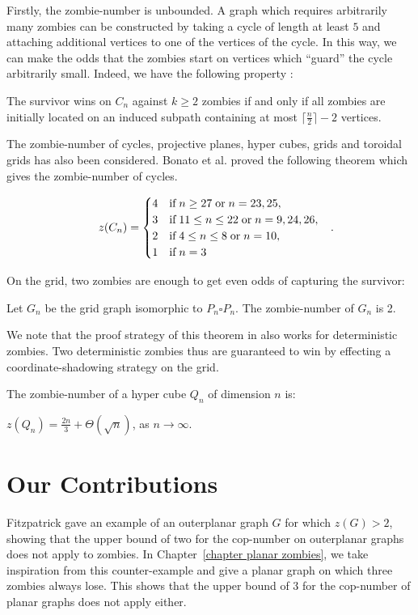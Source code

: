 Firstly, the zombie-number is unbounded. A graph which requires arbitrarily many zombies can be constructed by taking a cycle of length at least $5$ and attaching additional vertices to one of the vertices of the cycle. In this way, we can make the odds that the zombies start on vertices which ``guard'' the cycle arbitrarily small. Indeed, we have the following property \cite{bonato2016probabilistic}:
\begin{lemma}
The survivor wins on $C_n$ against $k \geq 2$ zombies if and only if all zombies are initially located on an induced subpath containing at most $\lceil\frac{n}{2}\rceil-2$ vertices. \label{lemma subpath}
\end{lemma}

The zombie-number of cycles, projective planes, hyper cubes, grids and toroidal grids has also been considered. Bonato et al. proved the following theorem \cite{bonato2016probabilistic} which gives the zombie-number of cycles.

\begin{theorem}
  \[z(C_n) =
  \begin{cases}
    4 & \text{if} \; n \geq 27 \; \text{or} \; n=23,25, \\
    3 & \text{if} \; 11 \leq n \leq 22 \; \text{or} \; n=9,24,26, \\
    2 & \text{if} \; 4 \leq n \leq 8 \; \text{or} \; n=10, \\
    1 & \text{if} \; n =3
\end{cases} \mperiod \]
\end{theorem}

On the grid, two zombies are enough to get even odds \cite{bonato2016probabilistic} of capturing the survivor:
\begin{theorem}
  Let $G_n$ be the grid graph isomorphic to $P_n \square P_n$. The zombie-number of $G_n$ is 2.
\end{theorem}
We note that the proof strategy of this theorem in \cite{bonato2016probabilistic} also works for deterministic zombies. Two deterministic zombies thus are guaranteed to win by effecting a coordinate-shadowing strategy on the grid.

The zombie-number of a hyper cube $Q_n$ of dimension $n$ is:
\begin{theorem}
$z(Q_n) = \frac{2n}{3} + \Theta(\sqrt{n})$, as $n \rightarrow \infty$.
\end{theorem}

\section{Our Contributions}
Fitzpatrick \cite{fitzpatrick2016deterministic} gave an example of an outerplanar graph $G$ for which $z(G) >2$, showing that the upper bound of two for the cop-number on outerplanar graphs does not apply to zombies. In Chapter~\ref{chapter planar zombies}, we take inspiration from this counter-example and give a planar graph on which three zombies always lose. This shows that the upper bound of 3 for the cop-number of planar graphs does not apply either.

